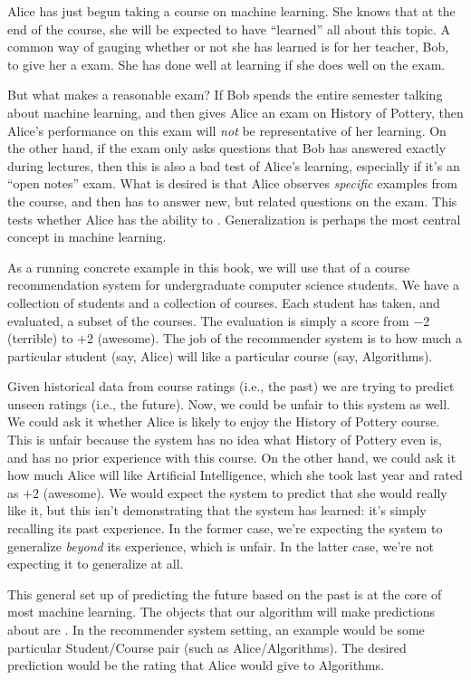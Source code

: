 Alice has just begun taking a course on machine learning.  She knows
that at the end of the course, she will be expected to have ``learned''
all about this topic.  A common way of gauging whether or not she has
learned is for her teacher, Bob, to give her a exam.  She has done
well at learning if she does well on the exam.

But what makes a reasonable exam?  If Bob spends the entire semester
talking about machine learning, and then gives Alice an exam on
History of Pottery, then Alice's performance on this exam will
\emph{not} be representative of her learning.  On the other hand, if
the exam only asks questions that Bob has answered exactly during lectures,
then this is also a bad test of Alice's learning, especially if it's
an ``open notes'' exam.  What is desired is that Alice observes
\emph{specific} examples from the course, and then has to answer new, but
related questions on the exam.  This tests whether Alice has the
ability to .  Generalization is perhaps the most
central concept in machine learning.

As a running concrete example in this book, we will use that of a
course recommendation system for undergraduate computer science
students.  We have a collection of students and a collection of
courses.  Each student has taken, and evaluated, a subset of the
courses.  The evaluation is simply a score from $-2$ (terrible) to
$+2$ (awesome).  The job of the recommender system is to
 how much a particular student (say, Alice) will like
a particular course (say, Algorithms).

Given historical data from course ratings (i.e., the past) we are
trying to predict unseen ratings (i.e., the future).  Now, we could be
unfair to this system as well.  We could ask it whether Alice is
likely to enjoy the History of Pottery course.  This is unfair because
the system has no idea what History of Pottery even is, and has no
prior experience with this course.  On the other hand, we could ask it
how much Alice will like Artificial Intelligence, which she took last
year and rated as $+2$ (awesome).  We would expect the system to
predict that she would really like it, but this isn't demonstrating
that the system has learned: it's simply recalling its past
experience.  In the former case, we're expecting the system to
generalize \emph{beyond} its experience, which is unfair.  In the
latter case, we're not expecting it to generalize at all.

This general set up of predicting the future based on the past is at
the core of most machine learning.  The objects that our algorithm
will make predictions about are .  In the
recommender system setting, an example would be some particular
Student/Course pair (such as Alice/Algorithms).  The desired
prediction would be the rating that Alice would give to Algorithms.

